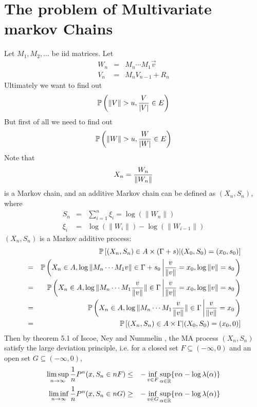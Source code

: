 \documentclass[12pt]{article}
\begin{document}
\section{The problem of Multivariate markov Chains}
Let $M_1, M_2, \dots$ be iid matrices. Let
\begin{eqnarray*}
  W_n &=& M_n \cdots M_1 \vec v  \\
  V_n &=& M_n V_{n-1} + R_n
\end{eqnarray*}
Ultimately we want to find out
\[
\P\left(
  \| V \| > u, {V \over |V|}  \in E
\right)
\]
But first of all we need to find out
\[
\P\left(
  \| W \| > u, {W \over |W|} \in E
\right)
\]
Note that
\[
X_n = {W_n \over \|W_n\|}
\]
is a Markov chain, and an additive Markov chain can be defined as
$(X_n, S_n)$, where
\begin{eqnarray*}
  S_n &=& \sum_{i=1}^n \xi_i = \log(\|W_n\|) \\
  \xi_i &=& \log(\|W_i\|) - \log(\|W_{i-1}\|)
\end{eqnarray*}
$(X_n, S_n)$ is a Markov additive process:
\begin{eqnarray*}
  && \P\left[
    (X_n, S_n) \in A \times (\Gamma + s) |
    (X_0, S_0) = (x_0, s_0)
  \right] \\
  &=& \P\left(
    X_n \in A, \log\|M_n \cdots M_1 v\| \in \Gamma + s_0 \left|
    \frac{v}{\|v\|} = x_0, \log \|v\|=s_0 \right.
  \right) \\
  &=& \P\left(
    X_n \in A, \log\|M_n \cdots M_1 \frac{v}{\|v\|}\| \in \Gamma \left|
    \frac{v}{\|v\|}=x_0, \log \|v\|=s_0 \right.
  \right) \\
  &=& \P\left(
    X_n \in A, \log\|M_n \cdots M_1 \frac{v}{\|v\|}\| \in \Gamma \left|
    \frac{v}{\|v\|}=x_0 \right.
  \right) \\
  &=& \P\left[
    (X_n, S_n) \in A \times \Gamma |
    (X_0, S_0) = (x_0, 0)
  \right]
\end{eqnarray*}
Then by theorem 5.1 of Iscoe, Ney and Nummelin \cite{NeyNummelin1985},
the MA process $(X_n, S_n)$ satisfy the large deviation principle,
i.e. for a closed set $F \subseteq (-\infty, 0)$ and an open set $G
\subseteq (-\infty, 0)$,
\begin{eqnarray*}
  \limsup_{n \to \infty} {1 \over n} P^n (x, S_n \in n F) &\leq&
  -\inf_{v \in F} \sup_{\alpha \in \mathbb R}\{v \alpha - \log
  \lambda(\alpha)\} \\
  \liminf_{n \to \infty} {1 \over n} P^n (x, S_n \in n G) &\geq&
  -\inf_{v \in G} \sup_{\alpha \in \mathbb R}\{v \alpha - \log
  \lambda(\alpha)\}
\end{eqnarray*}
\end{document}
